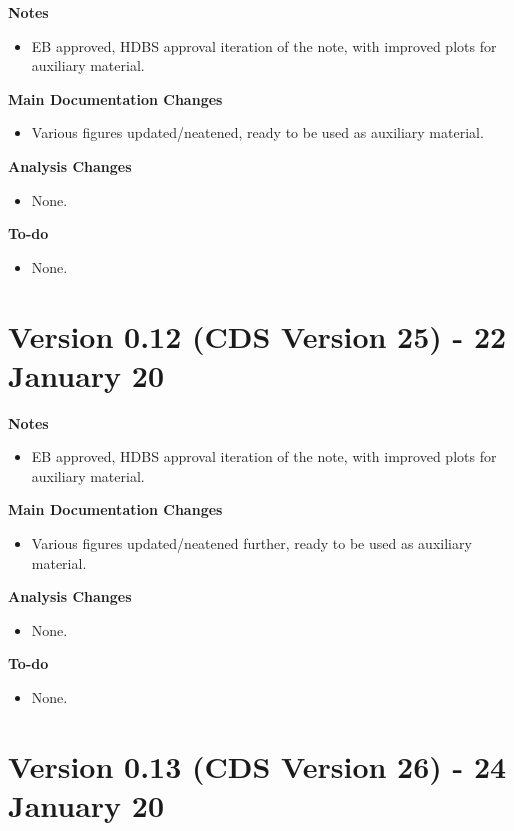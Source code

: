\documentclass[NOTE, atlasdraft=true, texlive=2017, UKenglish]{\ATLASLATEXPATH atlasdoc}
\begin{document}
\textbf{Notes}
\begin{itemize}
\item EB approved, HDBS approval iteration of the note, with improved plots for auxiliary material.
\end{itemize}

\textbf{Main Documentation Changes}
\begin{itemize}
\item Various figures updated/neatened, ready to be used as auxiliary material.
\end{itemize}

\textbf{Analysis Changes}
\begin{itemize}
\item None.
\end{itemize}

\textbf{To-do}
\begin{itemize}
\item None.
\end{itemize}


\section*{Version 0.12 (CDS Version 25) - 22 January 20}

\textbf{Notes}
\begin{itemize}
\item EB approved, HDBS approval iteration of the note, with improved plots for auxiliary material.
\end{itemize}

\textbf{Main Documentation Changes}
\begin{itemize}
\item Various figures updated/neatened further, ready to be used as auxiliary material.
\end{itemize}

\textbf{Analysis Changes}
\begin{itemize}
\item None.
\end{itemize}

\textbf{To-do}
\begin{itemize}
\item None.
\end{itemize}


\section*{Version 0.13 (CDS Version 26) - 24 January 20}
\end{document}
